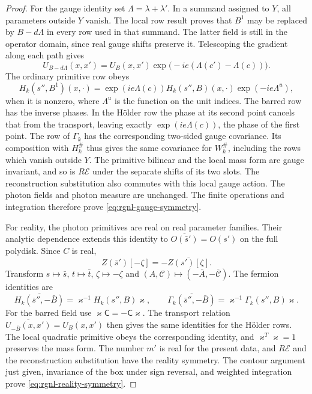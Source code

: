 \documentclass[11pt,letterpaper,reqno]{amsart}
\begin{document}
\begin{proof}
For the gauge identity set $\Lambda=\lambda+\lambda'$.
In a summand assigned to $Y$, all parameters outside $Y$
vanish. The local row result proves that $B^1$ may be
replaced by $B-d\Lambda$ in every row used in that
summand. The latter field is still in the operator domain,
since real gauge shifts preserve it.
Telescoping the gradient along each path gives
\[
 U_{B-d\Lambda}(x,x')
       =U_B(x,x')\exp\big(-ie(\Lambda(c')-\Lambda(c))\big).
\]
The ordinary primitive row obeys
\[
 H_k(s'',B^1)(x,\cdot)
       =\exp(ie\Lambda(c))H_k(s'',B)(x,\cdot)
                                                 \exp(-ie\Lambda^u),
\]
when it is nonzero, where $\Lambda^u$ is the function
on the unit indices. The barred row has the inverse
phases. In the H\"older row the phase at its second
point cancels that from the transport, leaving exactly
$\exp(ie\Lambda(c))$, the phase of the first point.
The row of $\Gamma_k$ has the corresponding two-sided
gauge covariance. Its composition with $H_k^\#$ thus
gives the same covariance for $W_k^\#$, including the
rows which vanish outside $Y$.
The primitive bilinear and the local mass form are
gauge invariant, and so is $R\mathscr E$ under the
separate shifts of its two slots. The reconstruction
substitution also commutes with this local gauge action.
The photon fields and photon measure are unchanged.
The finite operations and integration therefore prove
\eqref{eq:rgnl-gauge-symmetry}.

For reality, the photon primitives are real on real
parameter families. Their analytic dependence extends
this identity to
$\overline{O(\bar s')}=O(s')$ on the full polydisk.
Since $C$ is real,
\[
 Z(\bar s')[-\zeta]=-\overline{Z(s')[\zeta]}.
\]
Transform $s\mapsto\bar s$, $t\mapsto\bar t$,
$\zeta\mapsto-\zeta$ and
$(A,\mathscr C)\mapsto(-\bar A,-\overline{\mathscr C})$.
The fermion identities are
\[
 \overline{H_k(\bar s'',-\bar B)}
                         =\varkappa^{-1}H_k(s'',B)\varkappa,\qquad
 \overline{\Gamma_k(\bar s'',-\bar B)}
                         =\varkappa^{-1}\Gamma_k(s'',B)\varkappa.
\]
For the barred field use
$\varkappa\mathsf C=-\mathsf C\varkappa$.
The transport relation
$\overline{U_{-\bar B}(x,x')}=U_B(x,x')$
then gives the same identities for the H\"older rows.
The local quadratic primitive obeys the corresponding
identity, and $\varkappa^T\varkappa=1$ preserves the
mass form. The number $m'$ is real for the present data,
and $R\mathscr E$ and the reconstruction substitution
have the reality symmetry. The contour argument just
given, invariance of the box under sign reversal, and
weighted integration prove
\eqref{eq:rgnl-reality-symmetry}.


\end{proof}
\end{document}
